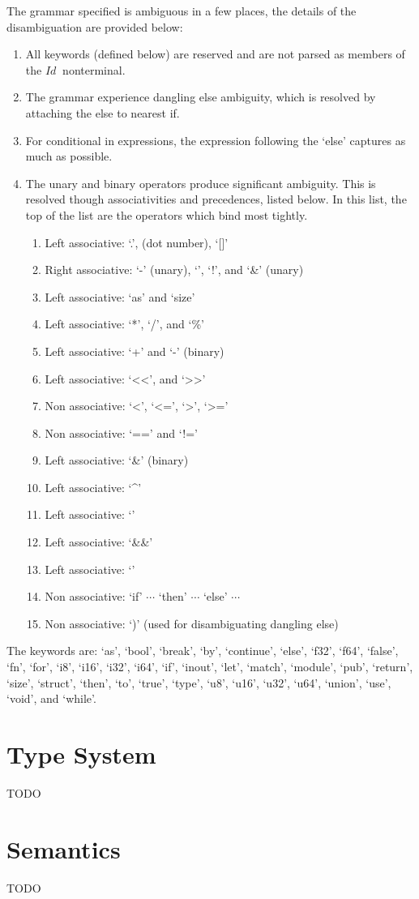 \documentclass[letterpaper]{article}
\newcommand{\nonterminal}[1]{#1\ }
\begin{document}
%
The grammar specified is ambiguous in a few places, the details of the disambiguation are provided below:
\begin{enumerate}
  \item All keywords (defined below) are reserved and are not parsed as members of the $\nonterminal{Id}$ nonterminal.
  \item The grammar experience dangling else ambiguity, which is resolved by attaching the else to nearest if.
  \item For conditional in expressions, the expression following the `else' captures as much as possible.
  \item The unary and binary operators produce significant ambiguity.
    This is resolved though associativities and precedences, listed below.
    In this list, the top of the list are the operators which bind most tightly.
    \begin{enumerate}
      \item Left associative: `.', (dot number), `[]'
      \item Right associative: `-' (unary), `\texttildelow', `!', and `\&' (unary)
      \item Left associative: `as' and `size'
      \item Left associative: `*', `/', and `\%'
      \item Left associative: `+' and `-' (binary)
      \item Left associative: `\textless\textless', and `\textgreater\textgreater'
      \item Non associative: `\textless', `\textless=', `\textgreater', `\textgreater='
      \item Non associative: `==' and `!='
      \item Left associative: `\&' (binary)
      \item Left associative: `\^{}'
      \item Left associative: `\textbar'
      \item Left associative: `\&\&'
      \item Left associative: `\textbar\textbar'
      \item Non associative: `if' $\cdots$ `then' $\cdots$ `else' $\cdots$
      \item Non associative: `)' (used for disambiguating dangling else)
    \end{enumerate}
\end{enumerate}
%
The keywords are: `as', `bool', `break', `by', `continue', `else', `f32', `f64', `false', `fn', `for', `i8', `i16', `i32', `i64', `if', `inout', `let', `match', `module', `pub', `return', `size', `struct', `then', `to', `true', `type', `u8', `u16', `u32', `u64', `union', `use', `void', and `while'.

\section{Type System}\label{sec:types}
TODO

\section{Semantics}\label{sec:semantics}
TODO
\end{document}
